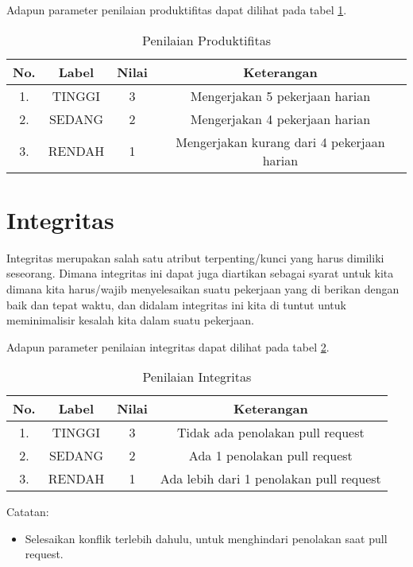 Adapun parameter penilaian produktifitas dapat dilihat pada tabel \ref{tab:nilaiproduktifitas}.

\begin{table}[H]
\caption{Penilaian Produktifitas}
\centering
\begin{tabular}{|c|c|c|c|}
\hline
\textbf{No.}&\textbf{Label}&\textbf{Nilai}&\textbf{Keterangan}\\
\hline
1.&TINGGI&3&Mengerjakan 5 pekerjaan harian\\
\hline
2.&SEDANG&2&Mengerjakan 4 pekerjaan harian\\
\hline
3.&RENDAH&1&Mengerjakan kurang dari 4 pekerjaan harian\\
\hline
\end{tabular}
\label{tab:nilaiproduktifitas}
\end{table}

\section{Integritas}
Integritas merupakan salah satu atribut terpenting/kunci yang harus dimiliki seseorang. Dimana integritas ini dapat juga diartikan sebagai syarat untuk kita dimana kita harus/wajib menyelesaikan suatu pekerjaan yang di berikan dengan baik dan tepat waktu, dan didalam integritas ini kita di tuntut untuk meminimalisir kesalah kita dalam suatu pekerjaan.

Adapun parameter penilaian integritas dapat dilihat pada tabel \ref{tab:nilaiintegritas}.

\begin{table}[H]
\caption{Penilaian Integritas}
\centering
\begin{tabular}{|c|c|c|c|}
\hline
\textbf{No.}&\textbf{Label}&\textbf{Nilai}&\textbf{Keterangan}\\
\hline
1.&TINGGI&3&Tidak ada penolakan pull request\\
\hline
2.&SEDANG&2&Ada 1 penolakan pull request\\
\hline
3.&RENDAH&1&Ada lebih dari 1 penolakan pull request\\
\hline
\end{tabular}
\label{tab:nilaiintegritas}
\end{table}

Catatan:
\begin{itemize}
\item Selesaikan konflik terlebih dahulu, untuk menghindari penolakan saat pull request.
\end{itemize}

